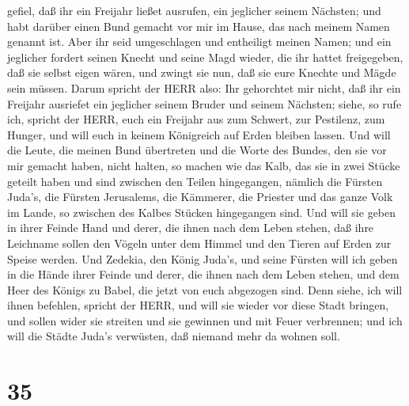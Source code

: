 gefiel, daß ihr ein Freijahr ließet ausrufen, ein jeglicher seinem
Nächsten; und habt darüber einen Bund gemacht vor mir im Hause, das nach
meinem Namen genannt ist.  Aber ihr seid umgeschlagen und
entheiligt meinen Namen; und ein jeglicher fordert seinen Knecht und
seine Magd wieder, die ihr hattet freigegeben, daß sie selbst eigen
wären, und zwingt sie nun, daß sie eure Knechte und Mägde sein müssen.
 Darum spricht der HERR also: Ihr gehorchtet mir nicht, daß
ihr ein Freijahr ausriefet ein jeglicher seinem Bruder und seinem
Nächsten; siehe, so rufe ich, spricht der HERR, euch ein Freijahr aus
zum Schwert, zur Pestilenz, zum Hunger, und will euch in keinem
Königreich auf Erden bleiben lassen.  Und will die Leute,
die meinen Bund übertreten und die Worte des Bundes, den sie vor mir
gemacht haben, nicht halten, so machen wie das Kalb, das sie in zwei
Stücke geteilt haben und sind zwischen den Teilen hingegangen,
 nämlich die Fürsten Juda's, die Fürsten Jerusalems, die
Kämmerer, die Priester und das ganze Volk im Lande, so zwischen des
Kalbes Stücken hingegangen sind.  Und will sie geben in
ihrer Feinde Hand und derer, die ihnen nach dem Leben stehen, daß ihre
Leichname sollen den Vögeln unter dem Himmel und den Tieren auf Erden
zur Speise werden.  Und Zedekia, den König Juda's, und
seine Fürsten will ich geben in die Hände ihrer Feinde und derer, die
ihnen nach dem Leben stehen, und dem Heer des Königs zu Babel, die jetzt
von euch abgezogen sind.  Denn siehe, ich will ihnen
befehlen, spricht der HERR, und will sie wieder vor diese Stadt bringen,
und sollen wider sie streiten und sie gewinnen und mit Feuer verbrennen;
und ich will die Städte Juda's verwüsten, daß niemand mehr da wohnen
soll.

\hypertarget{section-34}{%
\section{35}\label{section-34}}

